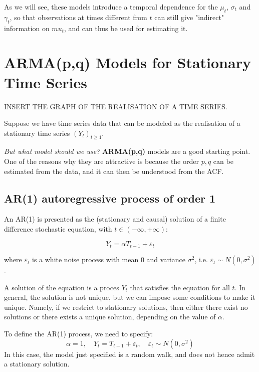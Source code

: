             As we will see, these models introduce a temporal dependence for the \(\mu_t\), \(\sigma_t\) and \(\gamma_t\), so that observations at times different from \(t\) can still give "indirect" information on \(mu_t\), and can thus be used for estimating it.

\newpage
\section{ARMA(p,q) Models for Stationary Time Series}

    INSERT THE GRAPH OF THE REALISATION OF A TIME SERIES.

    Suppose we have time series data that can be modeled as the realisation of a stationary time series \((Y_t)_{t \geq 1}\).

    \textit{But what model should we use?} \textbf{ARMA(p,q)} models are a good starting point. One of the reasons why they are attractive is because the order \(p,q\) can be estimated from the data, and it can then be understood from the ACF.

    \subsection{AR(1) autoregressive process of order 1}

        An AR(1) is presented as the (stationary and causal) solution of a finite difference stochastic equation, with \(t \in (-\infty, +\infty)\):

        \begin{equation}
            Y_t = \alpha T_{t-1} + \varepsilon_t 
        \end{equation}

        where \(\varepsilon_t\) is a white noise process with mean 0 and variance \(\sigma^2\), i.e. \(\varepsilon_t \sim N(0, \sigma^2)\).

        A solution of the equation is a proces \(Y_t\) that satisfies the equation for all \(t\). In general, the solution is not unique, but we can impose some conditions to make it unique.
        Namely, if we restrict to stationary solutions, then either there exist no solutions or there exists a unique solution, depending on the value of \(\alpha\).

        \begin{example}[\(\alpha =1\)]
            To define the AR(1) process, we need to specify:
            \[
            \alpha = 1, \quad Y_t = T_{t-1} + \varepsilon_t, \quad \varepsilon_t \sim N(0, \sigma^2)
            \]
            In this case, the model just specified is a random walk, and does not hence admit a stationary solution.
        \end{example}

